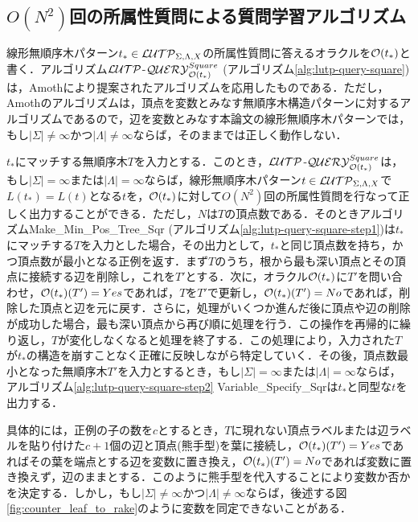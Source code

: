 \subsection{$O(N^2)$回の所属性質問による質問学習アルゴリズム}
線形無順序木パターン$t_*\in {\cal LUTP}_{\Sigma,\Lambda,X}$の所属性質問に答えるオラクルを${\cal O}(t_*)$と書く．アルゴリズム${\cal LUTP}$-${\cal QUERY}_{{\cal O}(t_{\ast})}^{Square}$ (アルゴリズム\ref{alg:lutp-query-square})は，Amoth\cite{amoth-ml2001}により提案されたアルゴリズムを応用したものである．ただし，Amothのアルゴリズムは，頂点を変数とみなす無順序木構造パターンに対するアルゴリズムであるので，辺を変数とみなす本論文の線形無順序木パターンでは，もし$|\Sigma|\not=\infty$かつ$|\Lambda|\not=\infty$ならば，そのままでは正しく動作しない．

$t_*$にマッチする無順序木$T$を入力とする．このとき，${\cal LUTP}$-${\cal QUERY}_{{\cal O}(t_{\ast})}^{Square}$は，もし$|\Sigma|=\infty$または$|\Lambda|=\infty$ならば，線形無順序木パターン$t\in {\cal LUTP}_{\Sigma,\Lambda,X}$で$L(t_*)=L(t)$となる$t$を，${\cal O}(t_*)$に対して$O(N^2)$回の所属性質問を行なって正しく出力することができる．ただし，$N$は$T$の頂点数である．そのときアルゴリズム{\sc Make\_Min\_Pos\_Tree\_Sqr} (アルゴリズム\ref{alg:lutp-query-square-step1})は$t_*$にマッチする$T$を入力とした場合，その出力として，$t_*$と同じ頂点数を持ち，かつ頂点数が最小となる正例を返す．まず$T$のうち，根から最も深い頂点とその頂点に接続する辺を削除し，これを$T'$とする．次に，オラクル${\cal O}(t_*)$に$T'$を問い合わせ，${\cal O}(t_*)(T')=Yes$であれば，$T$を$T'$で更新し，${\cal O}(t_*)(T')=No$であれば，削除した頂点と辺を元に戻す．さらに，処理がいくつか進んだ後に頂点や辺の削除が成功した場合，最も深い頂点から再び順に処理を行う．この操作を再帰的に繰り返し，$T$が変化しなくなると処理を終了する．この処理により，入力された$T$が$t_*$の構造を崩すことなく正確に反映しながら特定していく．その後，頂点数最小となった無順序木$T'$を入力とするとき，もし$|\Sigma|=\infty$または$|\Lambda|=\infty$ならば，アルゴリズム\ref{alg:lutp-query-square-step2} {\sc Variable\_Specify\_Sqr}は$t_*$と同型な$t$を出力する．

具体的には，正例の子の数を$c$とするとき，$T$に現れない頂点ラベルまたは辺ラベルを貼り付けた$c+1$個の辺と頂点(熊手型)を葉に接続し，${\cal O}(t_*)(T')=Yes$であればその葉を端点とする辺を変数に置き換え，${\cal O}(t_*)(T')=No$であれば変数に置き換えず，辺のままとする．このように熊手型を代入することにより変数か否かを決定する．しかし，もし$|\Sigma|\not=\infty$かつ$|\Lambda|\not=\infty$ならば，後述する図\ref{fig:counter_leaf_to_rake}のように変数を同定できないことがある．

